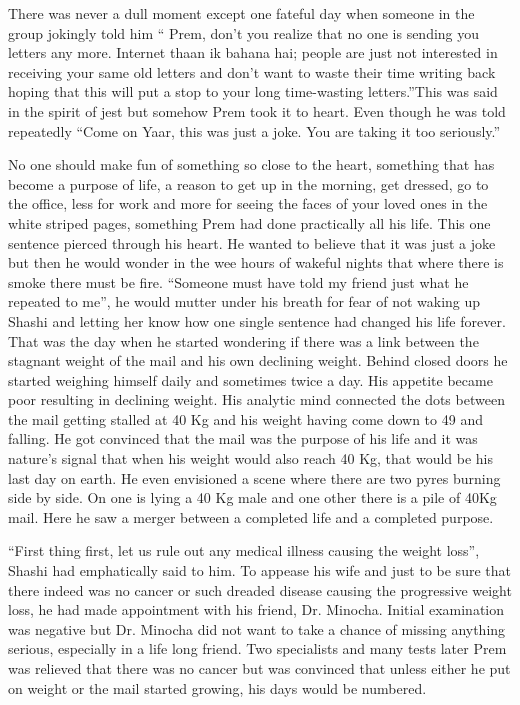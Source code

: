 There was never a dull moment except one fateful day when someone in the
group jokingly told him `` Prem, don't you realize that no one is
sending you letters any more. Internet thaan ik bahana hai; people are
just not interested in receiving your same old letters and don't want to
waste their time writing back hoping that this will put a stop to your
long time-wasting letters.''This was said in the spirit of jest but
somehow Prem took it to heart. Even though he was told repeatedly ``Come
on Yaar, this was just a joke. You are taking it too seriously.''

No one should make fun of something so close to the heart, something
that has become a purpose of life, a reason to get up in the morning,
get dressed, go to the office, less for work and more for seeing the
faces of your loved ones in the white striped pages, something Prem had
done practically all his life. This one sentence pierced through his
heart. He wanted to believe that it was just a joke but then he would
wonder in the wee hours of wakeful nights that where there is smoke
there must be fire. ``Someone must have told my friend just what he
repeated to me'', he would mutter under his breath for fear of not
waking up Shashi and letting her know how one single sentence had
changed his life forever. That was the day when he started wondering if
there was a link between the stagnant weight of the mail and his own
declining weight. Behind closed doors he started weighing himself daily
and sometimes twice a day. His appetite became poor resulting in
declining weight. His analytic mind connected the dots between the mail
getting stalled at 40 Kg and his weight having come down to 49 and
falling. He got convinced that the mail was the purpose of his life and
it was nature's signal that when his weight would also reach 40 Kg, that
would be his last day on earth. He even envisioned a scene where there
are two pyres burning side by side. On one is lying a 40 Kg male and one
other there is a pile of 40Kg mail. Here he saw a merger between a
completed life and a completed purpose.

``First thing first, let us rule out any medical illness causing the
weight loss'', Shashi had emphatically said to him. To appease his wife
and just to be sure that there indeed was no cancer or such dreaded
disease causing the progressive weight loss, he had made appointment
with his friend, Dr. Minocha. Initial examination was negative but Dr.
Minocha did not want to take a chance of missing anything serious,
especially in a life long friend. Two specialists and many tests later
Prem was relieved that there was no cancer but was convinced that unless
either he put on weight or the mail started growing, his days would be
numbered.

